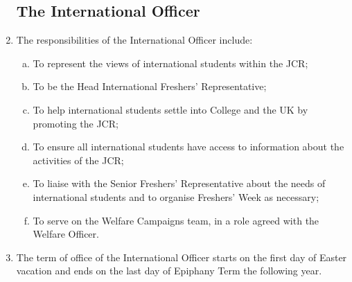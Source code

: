 \documentclass[12pt]{article}
\begin{document}
\begin{enumerate}
    \subsection{The International Officer}
    \item The responsibilities of the International Officer include:
    \begin{enumerate}[(a)]
        \item To represent the views of international students within the JCR;
        \item To be the Head International Freshers' Representative;
        \item To help international students settle into College and the UK by promoting the JCR;
        \item To ensure all international students have access to information about the activities of the JCR;
        \item To liaise with the Senior Freshers' Representative about the needs of international students and to organise Freshers' Week as necessary;
        \item To serve on the Welfare Campaigns team, in a role agreed with the Welfare Officer.
    \end{enumerate}
    \item The term of office of the International Officer starts on the first day of Easter vacation and ends on the last day of Epiphany Term the following year.

\end{enumerate}
\end{document}
